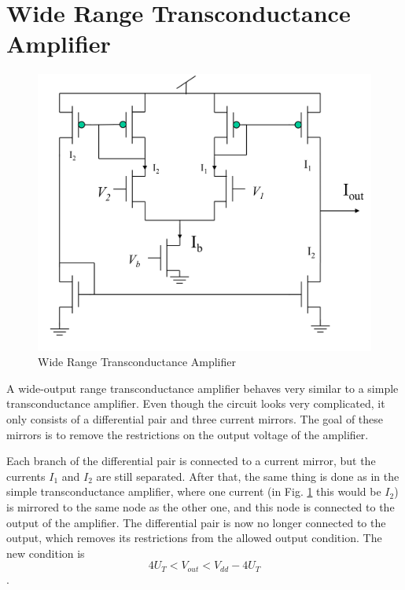 \section{Wide Range Transconductance Amplifier}

\begin{figure}[htbp]
  \centering
  \includegraphics[scale=0.5]{pics/wide_range_transamp.png}
  \caption{Wide Range Transconductance Amplifier \cite{lec4}}
  \label{fig:wr_Transamp}
\end{figure}\bigskip


A wide-output range transconductance amplifier behaves very similar to a simple transconductance amplifier. Even though the circuit looks very complicated, it only consists of a differential pair and three current mirrors. The goal of these mirrors is to remove the restrictions on the output voltage of the amplifier.
\par Each branch of the differential pair is connected to a current mirror, but the currents $I_1$ and $I_2$ are still separated. After that, the same thing is done as in the simple transconductance amplifier, where one current (in Fig. \ref{fig:wr_Transamp} this would be $I_2$) is mirrored to the same node as the other one, and this node is connected to the output of the amplifier. The differential pair is now no longer connected to the output, which removes its restrictions from the allowed output condition. The new condition is
$$ 4U_T < V_{out} < V_{dd} -4U_T$$.



